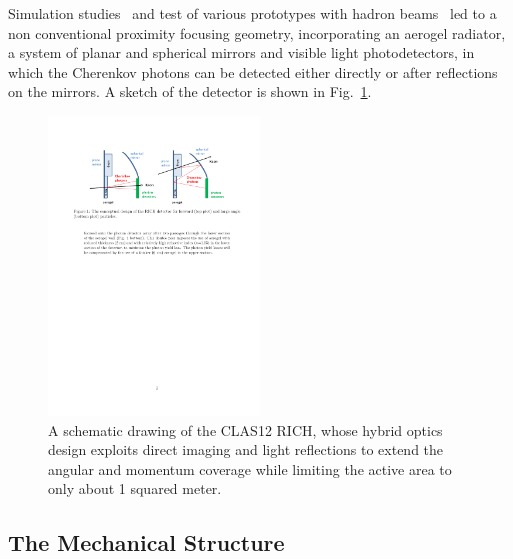\documentclass[final,5p,times,twocolumn]{elsarticle}
\begin{document}
Simulation studies~\cite{RICH:first,RICH:ElAlaoui} and test of various prototypes with hadron beams~\cite{RICH:CERN} led to a non 
conventional proximity focusing geometry, incorporating an aerogel radiator, a system of planar and spherical mirrors and 
visible light photodetectors, in which the Cherenkov photons can be detected either directly or after reflections on the 
mirrors. A sketch of the detector is shown in Fig.~\ref{fig:RICHsketch}.

\begin{figure}
\begin{center}
\includegraphics[width=0.50\textwidth]{EPS/Layout.pdf}
\caption{A schematic drawing of the CLAS12 RICH, whose hybrid optics design exploits direct 
imaging and light reflections to extend the angular and momentum coverage while limiting
the active area to only about 1 squared meter.}
\label{fig:RICHsketch}
\end{center}
\end{figure}

\subsection{The Mechanical Structure}
\end{document}
